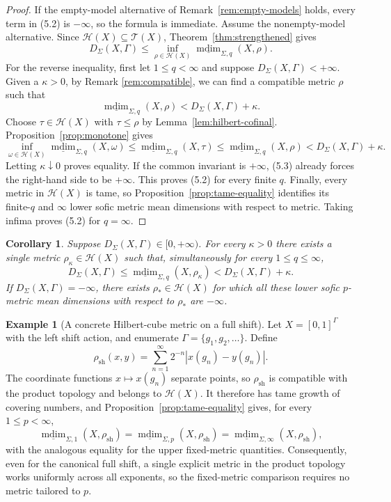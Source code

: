 \documentclass[12pt]{amsart}
\newtheorem{corollary}[theorem]{Corollary}
\theoremstyle{definition}
\newtheorem{example}[theorem]{Example}
\theoremstyle{remark}
\newcommand{\mdim}{\operatorname{mdim}}
\begin{document}
\begin{proof}
If the empty-model alternative of Remark~\ref{rem:empty-models} holds, every term in (5.2) is $-\infty$, so the formula is immediate. Assume the nonempty-model alternative. Since $\mathcal H(X)\subseteq\mathcal T(X)$, Theorem~\ref{thm:strengthened} gives
\[
 D_\Sigma(X,\Gamma)
 \leq\inf_{\rho\in\mathcal H(X)}
 \underline{\mdim}_{\Sigma,q}(X,\rho).
 \tag{5.3}
\]
For the reverse inequality, first let $1\leq q<\infty$ and suppose $D_\Sigma(X,\Gamma)<+\infty$. Given a $\kappa>0$, by Remark \ref{rem:compatible}, we can find a compatible metric $\rho$ such that
\[
 \underline{\mdim}_{\Sigma,q}(X,\rho)
 <D_\Sigma(X,\Gamma)+\kappa.
\]
Choose $\tau\in\mathcal H(X)$ with $\tau\leq\rho$ by Lemma~\ref{lem:hilbert-cofinal}. Proposition~\ref{prop:monotone} gives
\[
 \inf_{\omega\in\mathcal H(X)}
 \underline{\mdim}_{\Sigma,q}(X,\omega)
 \leq\underline{\mdim}_{\Sigma,q}(X,\tau)
 \leq\underline{\mdim}_{\Sigma,q}(X,\rho)
 <D_\Sigma(X,\Gamma)+\kappa.
\]
Letting $\kappa\downarrow0$ proves equality. If the common invariant is $+\infty$, (5.3) already forces the right-hand side to be $+\infty$. This proves (5.2) for every finite $q$. Finally, every metric in $\mathcal H(X)$ is tame, so Proposition~\ref{prop:tame-equality} identifies its finite-$q$ and $\infty$ lower sofic metric mean dimensions with respect to  metric. Taking infima proves (5.2) for $q=\infty$.
\end{proof}

\begin{corollary}
\label{cor:simultaneous-near-minimizers}
Suppose $D_\Sigma(X,\Gamma)\in[0,+\infty)$. For every $\kappa>0$ there
exists a single metric $\rho_\kappa\in\mathcal H(X)$ such that,
simultaneously for every $1\leq q\leq\infty$,
\[
 D_\Sigma(X,\Gamma)
 \leq\underline{\mdim}_{\Sigma,q}(X,\rho_\kappa)
 <D_\Sigma(X,\Gamma)+\kappa.
\]
If $D_\Sigma(X,\Gamma)=-\infty$, there exists
$\rho_*\in\mathcal H(X)$ for which all these lower sofic $p$-metric mean dimensions with respect to $\rho_{*}$
are $-\infty$.
\end{corollary}

\begin{example}[A concrete Hilbert-cube metric on a full shift]
\label{ex:full-shift}
Let $X=[0,1]^\Gamma$ with the left shift action, and enumerate
$\Gamma=\{g_1,g_2,\ldots\}$. Define
\[
 \rho_{\mathrm{sh}}(x,y)
 =\sum_{n=1}^{\infty}2^{-n}|x(g_n)-y(g_n)|.
\]
The coordinate functions $x\mapsto x(g_n)$ separate points, so
$\rho_{\mathrm{sh}}$ is compatible with the product topology and belongs
to $\mathcal H(X)$. It therefore has tame growth of covering numbers, and
Proposition~\ref{prop:tame-equality} gives, for every $1\leq p<\infty$,
\[
 \underline{\mdim}_{\Sigma,1}(X,\rho_{\mathrm{sh}})
 =\underline{\mdim}_{\Sigma,p}(X,\rho_{\mathrm{sh}})
 =\underline{\mdim}_{\Sigma,\infty}(X,\rho_{\mathrm{sh}}),
\]
with the analogous equality for the upper fixed-metric quantities. Consequently, even for the canonical full shift, a single explicit metric in the product topology works uniformly across all exponents, so the fixed-metric comparison requires no metric tailored to $p$.
\end{example}
\end{document}
